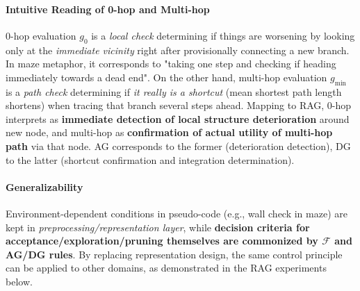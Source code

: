 \documentclass[12pt]{article}
\newcommand{\F}{\mathcal{F}}
\begin{document}
\paragraph{Intuitive Reading of 0-hop and Multi-hop}
0-hop evaluation $g_0$ is a \emph{local check} determining if things are worsening by looking only at the \emph{immediate vicinity} right after provisionally connecting a new branch. In maze metaphor, it corresponds to "taking one step and checking if heading immediately towards a dead end". On the other hand, multi-hop evaluation $g_{\min}$ is a \emph{path check} determining if \emph{it really is a shortcut} (mean shortest path length shortens) when tracing that branch several steps ahead. Mapping to RAG, 0-hop interprets as \textbf{immediate detection of local structure deterioration} around new node, and multi-hop as \textbf{confirmation of actual utility of multi-hop path} via that node. AG corresponds to the former (deterioration detection), DG to the latter (shortcut confirmation and integration determination).

\paragraph{Generalizability}\; Environment-dependent conditions in pseudo-code (e.g., wall check in maze) are kept in \emph{preprocessing/representation layer}, while \textbf{decision criteria for acceptance/exploration/pruning themselves are commonized by $\F$ and AG/DG rules}. By replacing representation design, the same control principle can be applied to other domains, as demonstrated in the RAG experiments below.
\end{document}
